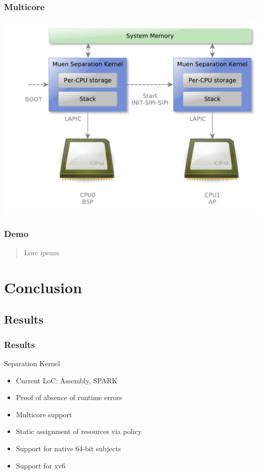 \documentclass[xcolor={dvipsnames}]{beamer}
\begin{document}
\begin{frame}\frametitle{Multicore}
	\includegraphics[scale=0.5]{images/mp-overview.pdf}
\end{frame}

\begin{frame}\frametitle{Demo}
	\begin{quote}
		Lore ipsum
	\end{quote}
\end{frame}

\section{Conclusion}
\subsection{Results}
\begin{frame}\frametitle{Results}
\begin{block}{Separation Kernel}
\begin{itemize}
	\item Current LoC: Assembly, SPARK
	\item Proof of absence of runtime errors
	\item Multicore support
	\item Static assignment of resources via policy
	\item Support for native 64-bit subjects
	\item Support for xv6
\end{itemize}
\end{block}
\end{frame}
\end{document}
